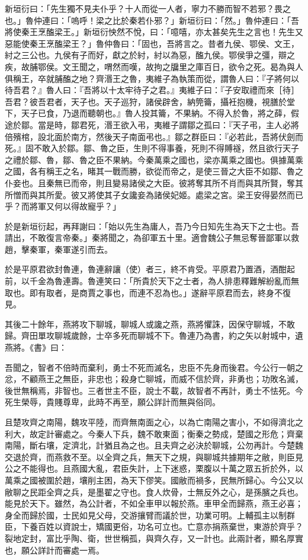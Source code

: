 \begin{pinyinscope}
新垣衍曰：「先生獨不見夫仆乎？十人而從一人者，寧力不勝而智不若邪？畏之也。」魯仲連曰：「嗚呼！梁之比於秦若仆邪？」新垣衍曰：「然。」魯仲連曰：「吾將使秦王烹醢梁王。」新垣衍怏然不悅，曰：「噫嘻，亦太甚矣先生之言也！先生又惡能使秦王烹醢梁王？」魯仲魯曰：「固也，吾將言之。昔者九侯、鄂侯、文王，紂之三公也。九侯有子而好，獻之於紂，紂以為惡，醢九侯。鄂侯爭之彊，辯之疾，故脯鄂侯。文王聞之，喟然而嘆，故拘之牖里之庫百日，欲令之死。曷為與人俱稱王，卒就脯醢之地？齊湣王之魯，夷維子為執策而從，謂魯人曰：『子將何以待吾君？』魯人曰：『吾將以十太牢待子之君。』夷維子曰：『子安取禮而來［待］吾君？彼吾君者，天子也。天子巡狩，諸侯辟舍，納筦籥，攝衽抱機，視膳於堂下，天子已食，乃退而聽朝也。』魯人投其籥，不果納。不得入於魯，將之薛，假途於鄒。當是時，鄒君死，湣王欲入弔，夷維子謂鄒之孤曰：『天子弔，主人必將倍殯棺，設北面於南方，然後天子南面弔也。』鄒之群臣曰：『必若此，吾將伏劍而死。』固不敢入於鄒。鄒、魯之臣，生則不得事養，死則不得賻襚，然且欲行天子之禮於鄒、魯，鄒、魯之臣不果納。今秦萬乘之國也，梁亦萬乘之國也。俱據萬乘之國，各有稱王之名，睹其一戰而勝，欲從而帝之，是使三晉之大臣不如鄒、魯之仆妾也。且秦無已而帝，則且變易諸侯之大臣。彼將奪其所不肖而與其所賢，奪其所憎而與其所愛。彼又將使其子女讒妾為諸侯妃姬。處梁之宮。梁王安得晏然而已乎？而將軍又何以得故寵乎？」

於是新垣衍起，再拜謝曰：「始以先生為庸人，吾乃今日知先生為天下之士也。吾請出，不敢復言帝秦。」秦將聞之，為卻軍五十里。適會魏公子無忌奪晉鄙軍以救趙，擊秦軍，秦軍遂引而去。

於是平原君欲封魯連，魯連辭讓（使）者三，終不肯受。平原君乃置酒，酒酣起前，以千金為魯連壽。魯連笑曰：「所貴於天下之士者，為人排患釋難解紛亂而無取也。即有取者，是商賈之事也，而連不忍為也。」遂辭平原君而去，終身不復見。

其後二十餘年，燕將攻下聊城，聊城人或讒之燕，燕將懼誅，因保守聊城，不敢歸。齊田單攻聊城歲餘，士卒多死而聊城不下。魯連乃為書，約之矢以射城中，遺燕將。《書》曰：

吾聞之，智者不倍時而棄利，勇士不死而滅名，忠臣不先身而後君。今公行一朝之忿，不顧燕王之無臣，非忠也；殺身亡聊城，而威不信於齊，非勇也；功敗名滅，後世無稱焉，非智也。三者世主不臣，說士不載，故智者不再計，勇士不怯死。今死生榮辱，貴賤尊卑，此時不再至，願公詳計而無與俗同。

且楚攻齊之南陽，魏攻平陸，而齊無南面之心，以為亡南陽之害小，不如得濟北之利大，故定計審處之。今秦人下兵，魏不敢東面；衡秦之勢成，楚國之形危；齊棄南陽，斷右壤，定濟北，計猶且為之也。且夫齊之必決於聊城，公勿再計。今楚魏交退於齊，而燕救不至。以全齊之兵，無天下之規，與聊城共據期年之敝，則臣見公之不能得也。且燕國大亂，君臣失計，上下迷惑，栗腹以十萬之眾五折於外，以萬乘之國被圍於趙，壤削主困，為天下僇笑。國敝而禍多，民無所歸心。今公又以敝聊之民距全齊之兵，是墨翟之守也。食人炊骨，士無反外之心，是孫臏之兵也。能見於天下。雖然，為公計者，不如全車甲以報於燕。車甲全而歸燕，燕王必喜；身全而歸於國，士民如見父母，交游攘臂而議於世，功業可明。上輔孤主以制群臣，下養百姓以資說士，矯國更俗，功名可立也。亡意亦捐燕棄世，東游於齊乎？裂地定封，富比乎陶、衛，世世稱孤，與齊久存，又一計也。此兩計者，顯名厚實也，願公詳計而審處一焉。


\end{pinyinscope}
